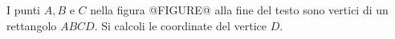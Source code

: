 I punti \(A,B\) e \(C\) nella figura 
@FIGURE@ alla fine del testo
sono vertici di un rettangolo \({ABCD}\).
Si calcoli le coordinate del vertice \(D\).